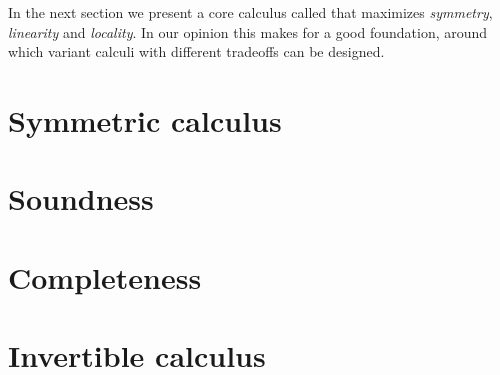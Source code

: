 \begin{scope}
In the next section we present a core calculus called  that
maximizes \emph{symmetry}, \emph{linearity} and \emph{locality}. In our opinion
this makes for a good  foundation, around which variant
calculi with different tradeoffs can be designed.


\section{Symmetric calculus}



\section{Soundness}



\section{Completeness}



\section{Invertible calculus}





%   


\end{scope}

